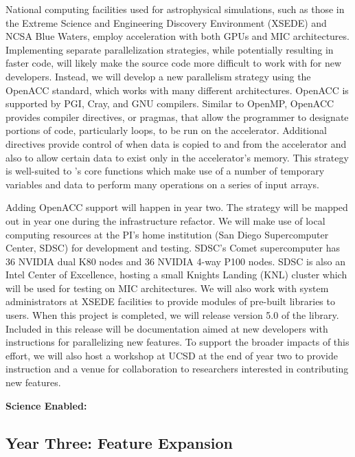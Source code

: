 National computing facilities used for astrophysical simulations, such
as those in the Extreme Science and Engineering Discovery Environment
(XSEDE) and NCSA Blue Waters, employ acceleration with both GPUs and
MIC architectures.  Implementing separate parallelization strategies,
while potentially resulting in faster code, will likely make the
source code more difficult to work with for new developers.  Instead,
we will develop a new parallelism strategy using the OpenACC standard,
which works with many different architectures.  OpenACC is supported
by PGI, Cray, and GNU compilers.  Similar to OpenMP, OpenACC provides
compiler directives, or pragmas, that allow the programmer to
designate portions of code, particularly loops, to be run on the
accelerator.  Additional directives provide control of when data is
copied to and from the accelerator and also to allow certain data to
exist only in the accelerator's memory.  This strategy is well-suited
to \grackle{}'s core functions which make use of a number of temporary
variables and data to perform many operations on a series of input
arrays.

Adding OpenACC support will happen in year two.  The strategy will be
mapped out in year one during the infrastructure refactor.  We will
make use of local computing resources at the PI's home institution
(San Diego Supercomputer Center, SDSC) for development and testing.
SDSC's Comet supercomputer has 36 NVIDIA dual K80 nodes and 36 NVIDIA
4-way P100 nodes.  SDSC is also an Intel Center of Excellence, hosting
a small Knights Landing (KNL) cluster which will be used for testing
on MIC architectures.
We will also work with system administrators at XSEDE facilities to
provide modules of pre-built \grackle{} libraries to users.  When this
project is completed, we will
release version 5.0 of the \grackle{} library.  Included in this
release will be documentation aimed at new developers with
instructions for parallelizing new features.  To support the broader
impacts of this effort, we will also host a
workshop at UCSD at the end of year two to provide instruction and
a venue for collaboration to researchers interested in contributing
new features.

\textbf{Science Enabled:}

\subsection{Year Three: Feature Expansion}

